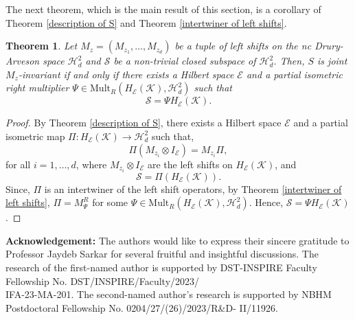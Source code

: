 \documentclass[12pt]{amsart}%
\newtheorem{theorem}{Theorem}[section]
\numberwithin{equation}{section}
\newcommand{\cle}{\mathcal{E}}
\newcommand{\clh}{\mathcal{H}}
\newcommand{\clk}{\mathcal{K}}
\newcommand{\cls}{\mathcal{S}}
\begin{document}
The next theorem, which is the main result of this section, is a corollary of Theorem \ref{description of S} and Theorem \ref{intertwiner of left shifts}.
\begin{theorem}\label{inv-sub-left-shift}
Let $M_z=(M_{z_1},\ldots,M_{z_d})$ be a tuple of left shifts on the nc Drury-Arveson space $\clh^2_d$ and $\cls$ be a non-trivial closed subspace of $\clh^2_d$. Then, $S$ is joint $M_z$-invariant if and only if there exists a Hilbert space $\cle$ and a partial isometric right multiplier $\Psi\in\text{Mult}_R(H_{\cle}(\clk),\clh^2_d)$ such that 
\[
\cls=\Psi H_{\cle}(\clk).
\]
\end{theorem}
\begin{proof}
By Theorem \ref{description of S}, there exists a Hilbert space $\cle$ and a partial isometric map $\Pi:H_{\cle}(\clk)\to \clh^2_d$ such that,
\[
\Pi(M_{z_i}\otimes I_{\cle})=M_{z_i}\Pi,
\]
for all $i=1,\ldots,d$, where $M_{z_i}\otimes I_{\cle}$ are the left shifts on $H_{\cle}(\clk)$, and 
\[
\cls=\Pi(H_{\cle}(\clk)). 
\]
Since, $\Pi$ is an intertwiner of the left shift operators, by Theorem \ref{intertwiner of left shifts}, $\Pi=M^R_{\Psi}$ for some $\Psi\in \text{Mult}_R(H_{\cle}(\clk),\clh^2_d)$. Hence, $\cls=\Psi H_{\cle}(\clk)$. 
\end{proof} 

\vspace{0.1in} \noindent\textbf{Acknowledgement:} The authors would like to express their sincere gratitude to Professor Jaydeb Sarkar for several fruitful and insightful discussions. The research of the first-named author is supported by DST-INSPIRE Faculty Fellowship No. DST/INSPIRE/Faculty/2023/\\IFA-23-MA-201. The second-named author's research is supported by NBHM Postdoctoral Fellowship No. 0204/27/(26)/2023/R\&D- II/11926.
\end{document}
